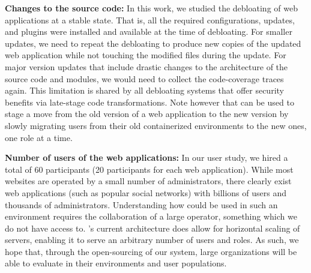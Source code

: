 \noindent\textbf{Changes to the source code:} 
In this work, we studied the debloating of web applications at a stable state. 
That is, all the required configurations, updates, and plugins were installed and available at the time of debloating. 
For smaller updates, we need to repeat the debloating to produce new copies of the updated web application while not touching the modified files during the update. 
For major version updates that include drastic changes to the architecture of the source code and modules, we would need to collect the code-coverage traces again. This limitation is shared by all debloating systems that offer security benefits via late-stage code transformations. Note however that \dbltr{} can be used to stage a move from the old version of a web application to the new version by slowly migrating users from their old containerized environments to the new ones, one role at a time.

\noindent\textbf{Number of users of the web applications:} 
In our user study, we hired a total of 60 participants (20 participants for each web application). 
While most websites are operated by a small number of administrators, there clearly exist web applications (such as popular social networks) with billions of users and thousands of administrators. Understanding how \dbltr{} could be used in such an environment requires the collaboration of a large operator, something which we do not have access to. \dbltr{}'s current architecture does allow for horizontal scaling of servers, enabling it to serve an arbitrary number of users and roles. As such, we hope that, through the open-sourcing of our system, large organizations will be able to evaluate \dbltr{} in their environments and user populations.